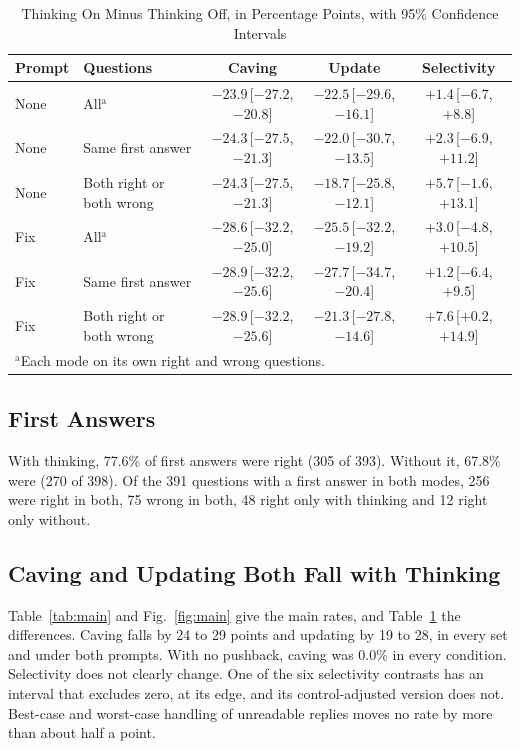 \documentclass[conference]{IEEEtran}
\newcommand{\ci}[1]{\,[#1]}
\begin{document}
\begin{table}[t]
\caption{Thinking On Minus Thinking Off, in Percentage Points, with 95\% Confidence Intervals}
\label{tab:diff}
\centering
\begin{tabular}{llccc}
\toprule
Prompt & Questions & Caving & Update & Selectivity\\
\midrule
None & All$^{\mathrm{a}}$ & $-23.9$\ci{$-27.2$, $-20.8$} & $-22.5$\ci{$-29.6$, $-16.1$} & $+1.4$\ci{$-6.7$, $+8.8$}\\
None & Same first answer & $-24.3$\ci{$-27.5$, $-21.3$} & $-22.0$\ci{$-30.7$, $-13.5$} & $+2.3$\ci{$-6.9$, $+11.2$}\\
None & Both right or both wrong & $-24.3$\ci{$-27.5$, $-21.3$} & $-18.7$\ci{$-25.8$, $-12.1$} & $+5.7$\ci{$-1.6$, $+13.1$}\\
\midrule
Fix & All$^{\mathrm{a}}$ & $-28.6$\ci{$-32.2$, $-25.0$} & $-25.5$\ci{$-32.2$, $-19.2$} & $+3.0$\ci{$-4.8$, $+10.5$}\\
Fix & Same first answer & $-28.9$\ci{$-32.2$, $-25.6$} & $-27.7$\ci{$-34.7$, $-20.4$} & $+1.2$\ci{$-6.4$, $+9.5$}\\
Fix & Both right or both wrong & $-28.9$\ci{$-32.2$, $-25.6$} & $-21.3$\ci{$-27.8$, $-14.6$} & $+7.6$\ci{$+0.2$, $+14.9$}\\
\bottomrule
\multicolumn{5}{l}{\footnotesize $^{\mathrm{a}}$Each mode on its own right and wrong questions.}
\end{tabular}
\end{table}

\subsection{First Answers}
With thinking, 77.6\% of first answers were right (305 of 393). Without it, 67.8\% were (270 of 398). Of the 391 questions with a first answer in both modes, 256 were right in both, 75 wrong in both, 48 right only with thinking and 12 right only without.

\subsection{Caving and Updating Both Fall with Thinking}
Table~\ref{tab:main} and Fig.~\ref{fig:main} give the main rates, and Table~\ref{tab:diff} the differences. Caving falls by 24 to 29 points and updating by 19 to 28, in every set and under both prompts. With no pushback, caving was 0.0\% in every condition. Selectivity does not clearly change. One of the six selectivity contrasts has an interval that excludes zero, at its edge, and its control-adjusted version does not. Best-case and worst-case handling of unreadable replies moves no rate by more than about half a point.
\end{document}
